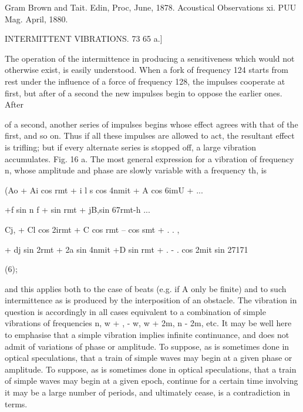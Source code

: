 Gram Brown and Tait. Edin, Proc, June, 1878. Acoustical Observations xi.  PUU
Mag. April, 1880.

INTERMITTENT VIBRATIONS.  73 65 a.]

The operation of the intermittence in producing a sensitiveness which would not
otherwise exist, is easily understood. When a fork of frequency 124 starts from
rest under the influence of a force of frequency 128, the impulses cooperate at
first, but after of a second the new impulses begin to oppose the earlier ones.
After

of a second, another series of impulses begins whose effect agrees with that of
the first, and so on. Thus if all these impulses are allowed to act, the
resultant effect is trifling; but if every alternate series is stopped off, a
large vibration accumulates.  Fig. 16 a.  The most general expression for a
vibration of frequency n, whose amplitude and phase are slowly variable with a
frequency th, is

(Ao + Ai cos rmt + i l s cos 4nmit + A cos 6imU + ...

 +f sin n f + sin rmt + jB,sin 67rmt-h ...

 Cj, + Cl cos 2irmt + C cos rmt -- cos smt + . . ,

+ dj sin 2rmt + 2a sin 4nmit +D sin rmt + . - .  cos 2mit sin 27171

(6);

and this applies both to the case of beats (e.g. if A only be finite) and to
such intermittence as is produced by the interposition of an obstacle. The
vibration in question is accordingly in all cases equivalent to a combination
of simple vibrations of frequencies n, w + , - w, w + 2m, n - 2m, etc.  It may
be well here to emphasise that a simple vibration implies infinite continuance,
and does not admit of variations of phase or amplitude. To suppose, as is
sometimes done in optical speculations, that a train of simple waves may begin
at a given phase or amplitude. To suppose, as is sometimes done in optical
speculations, that a train of simple waves may begin at a given epoch, continue
for a certain time involving it may be a large number of periods, and
ultimately cease, is a contradiction in terms.

